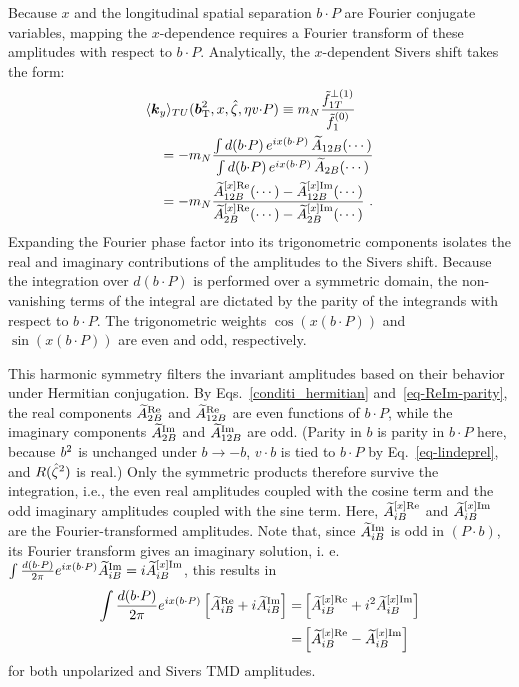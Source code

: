 
Because $x$ and the longitudinal spatial separation $b \cdot P$ are Fourier conjugate variables, mapping the $x$-dependence requires a Fourier transform of these amplitudes with respect to $b \cdot P$. Analytically, the $x$-dependent Sivers shift takes the form:
\begin{align}
	&\langle \vect{k}_y \rangle_{TU}(\vprp{\bvec}^2,x,\zetahat,\eta v \tcdot P)
	\equiv \mN \frac{\tilde f_{1T}^{\perp(1)}}{\tilde f_1^{(0)}} \nonumber \\
	&\quad = -\mN \frac{\int d(\bvec\tcdot P)\,e^{ix(\bvec\tcdot P)}\, \tAmp_{12B}(\cdots)}{\int d(\bvec\tcdot P)\,e^{ix(\bvec\tcdot P)}\,\tAmp_{2B}(\cdots)} \nonumber \\
	&\quad = -\mN \frac{\tAmp_{12B}^{[x]\text{Re}}(\cdots)-\tAmp_{12B}^{[x]\text{Im}}(\cdots)}{\tAmp_{2B}^{[x]\text{Re}}(\cdots)-\tAmp_{2B}^{[x]\text{Im}}(\cdots)}\ .
	\label{eq:sivers_shift_xdep}
\end{align}
 Expanding the Fourier phase factor into its trigonometric components isolates the real and imaginary contributions of the amplitudes to the Sivers shift. Because the integration over $d(b \cdot P)$ is performed over a symmetric domain, the non-vanishing terms of the integral are dictated by the parity of the integrands with respect to $b \cdot P$. The trigonometric weights $\cos\left(x(b\cdot P)\right)$ and $\sin\left(x(b\cdot P)\right)$ are even and odd, respectively.

This harmonic symmetry filters the invariant amplitudes based on their behavior under Hermitian conjugation. By Eqs.~\eqref{conditi_hermitian} and~\eqref{eq-ReIm-parity}, the real components $\widetilde{A}_{2B}^{\text{Re}}$ and $\widetilde{A}_{12B}^{\text{Re}}$ are even functions of $b \cdot P$, while the imaginary components $\widetilde{A}_{2B}^{\text{Im}}$ and $\widetilde{A}_{12B}^{\text{Im}}$ are odd. (Parity in $b$ is parity in $b\cdot P$ here, because $b^2$ is unchanged under $b\to-b$, $v\cdot b$ is tied to $b\cdot P$ by Eq.~\eqref{eq-lindeprel}, and $R({\hat \zeta}^2)$ is real.) Only the symmetric products therefore survive the integration, i.e., the even real amplitudes coupled with the cosine term and the odd imaginary amplitudes coupled with the sine term. Here, $\widetilde{A}_{iB}^{[x]\text{Re}}$ and $\widetilde{A}_{iB}^{[x]\text{Im}}$ are the Fourier-transformed amplitudes. Note that, since $\widetilde{A}_{iB}^{\text{Im}}$ is odd in $(P\cdot b)$, its Fourier transform gives an imaginary solution, i. e. $\int \frac{d(b {\cdot} P)}{2\pi}e^{ix(b\cdot P)}\widetilde{A}_{iB}^{\text{Im}}=i\widetilde{A}_{iB}^{[x]\text{Im}}$, this results in
\begin{align}
    \int \frac{d(b {\cdot} P)}{2\pi}e^{ix(b\cdot P)} \left[\widetilde{A}_{iB}^{\text{Re}}+i\widetilde{A}_{iB}^{\text{Im}}\right]=&\left[\widetilde{A}_{iB}^{[x]\text{Re}}+i^2\widetilde{A}_{iB}^{[x]\text{Im}}\right]\\
    =&\left[\widetilde{A}_{iB}^{[x]\text{Re}}-\widetilde{A}_{iB}^{[x]\text{Im}}\right]
    \label{reminusimag-amp}
\end{align}
for both unpolarized and Sivers TMD amplitudes. 

